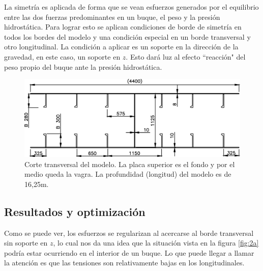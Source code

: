 \documentclass[onecolumn,10pt,titlepage]{article}
\newcommand{\unit}[1]{\textsf{#1}}
\newcommand{\meter}{\unit{m}}
\newcommand{\si}[1]{#1}
\newcommand{\SI}[2]{#1\si{#2}}
\begin{document}
La simetría es aplicada de forma que se vean esfuerzos generados por el equilibrio entre las dos fuerzas predominantes en un buque, el peso y la presión hidrostática. Para lograr esto se aplican condiciones de borde de simetría en todos los bordes del modelo y una condición especial en un borde transversal y otro longitudinal. La condición a aplicar es un soporte en la dirección de la gravedad, en este caso, un soporte en $z$. Esto dará luz al efecto ``reacción"{} del peso propio del buque ante la presión hidrostática.



 \begin{figure}[htb!]
     \centering
     \includegraphics[width=0.7\linewidth]{fig/MODELO.eps}
     \caption{Corte transversal del modelo. La placa superior es el fondo y por el medio queda la vagra. La profundidad (longitud) del modelo es de \SI{16,25}{\meter}.}
     \label{fig:modeloTransversal}
 \end{figure}



\subsection{Resultados y optimización}
Como se puede ver, los esfuerzos se regularizan al acercarse al borde transversal sin soporte en $z$, lo cual nos da una idea que la situación vista en la figura \ref{fig:2a} podría estar ocurriendo en el interior de un buque. Lo que puede llegar a llamar la atención es que las tensiones son relativamente bajas en los longitudinales.
\end{document}
